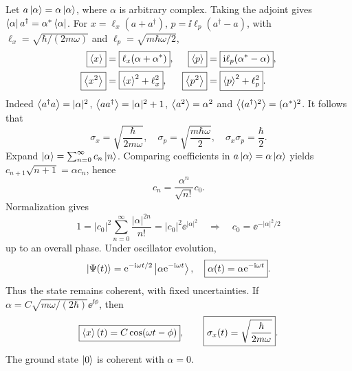 Let $a\left|\alpha\right\rangle=\alpha\left|\alpha\right\rangle$,
where $\alpha$ is arbitrary complex.
Taking the adjoint gives
$\left\langle\alpha\right| a^\dagger=\alpha^*\left\langle\alpha\right|$.
For $x=\ell_x(a+a^\dagger)$,
$p=\ii\ell_p(a^\dagger-a)$,
with $\ell_x=\sqrt{\hbar/(2m\omega)}$ and
$\ell_p=\sqrt{m\hbar\omega/2}$,
\begin{align}
\boxed{\left\langle x\right\rangle}&=\boxed{\ell_x(\alpha+\alpha^*)},&
\boxed{\left\langle p\right\rangle}&=\boxed{\mathrm{i}\ell_p(\alpha^*-\alpha)},\\
\boxed{\left\langle x^2\right\rangle}&=\boxed{\left\langle x\right\rangle^2+\ell_x^2},&
\boxed{\left\langle p^2\right\rangle}&=\boxed{\left\langle p\right\rangle^2+\ell_p^2}.
\end{align}
Indeed $\left\langle a^\dagger a\right\rangle=|\alpha|^2$,
$\left\langle aa^\dagger\right\rangle=|\alpha|^2+1$,
$\left\langle a^2\right\rangle=\alpha^2$ and
$\left\langle(a^\dagger)^2\right\rangle=(\alpha^*)^2$.
It follows that
\begin{equation}
\boxed{\sigma_x=\sqrt{\frac{\hbar}{2m\omega}}},
\quad
\boxed{\sigma_p=\sqrt{\frac{m\hbar\omega}{2}}},
\quad
\boxed{\sigma_x\sigma_p=\frac\hbar2}.
\end{equation}
Expand $\left|\alpha\right\rangle=\sum_{n=0}^\infty c_n\left|n\right\rangle$.
Comparing coefficients in
$a\left|\alpha\right\rangle=\alpha\left|\alpha\right\rangle$ yields
$c_{n+1}\sqrt{n+1}=\alpha c_n$, hence
\begin{equation}
c_n=\frac{\alpha^n}{\sqrt{n!}}c_0.
\end{equation}
Normalization gives
\begin{equation}
1=|c_0|^2\sum_{n=0}^\infty
\frac{|\alpha|^{2n}}{n!}
=|c_0|^2\ee^{|\alpha|^2}
\quad\Rightarrow\quad
\boxed{c_0=\ee^{-|\alpha|^2/2}}
\end{equation}
up to an overall phase.
Under oscillator evolution,
\begin{equation}
\left|\Psi(t)\right\rangle=
\mathrm{e}^{-\mathrm{i}\omega t/2}
\left|\alpha\mathrm{e}^{-\mathrm{i}\omega t}\right\rangle,
\quad
\boxed{\alpha(t)=\alpha\mathrm{e}^{-\mathrm{i}\omega t}}.
\end{equation}
Thus the state remains coherent, with fixed
uncertainties. If
$\alpha=C\sqrt{m\omega/(2\hbar)}
\ee^{\ii\phi}$, then
\begin{equation}
\boxed{\left\langle x\right\rangle(t)=C\cos(\omega t-\phi)},
\qquad
\boxed{\sigma_x(t)=\sqrt{\frac{\hbar}{2m\omega}}}.
\end{equation}
The ground state $\left|0\right\rangle$ is coherent with
$\boxed{\alpha=0}$.

